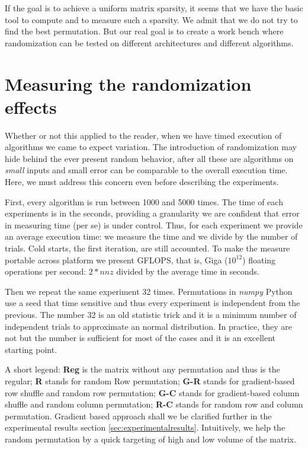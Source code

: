 \documentclass[manuscript,screen]{acmart}
\begin{document}

If the goal is to achieve a uniform matrix sparsity, it seems that we
have the basic tool to compute and to measure such a sparsity. We
admit that we do not try to find the best permutation. But our real
goal is to create a work bench where randomization can be tested on
different architectures and different algorithms.

\section{Measuring the randomization effects}
\label{sec:measuring}

Whether or not this applied to the reader, when we have timed
execution of algorithms we came to expect variation.  The introduction
of randomization may hide behind the ever present random behavior,
after all these are algorithms on {\em small} inputs and small error
can be comparable to the overall execution time. Here, we must address
this concern even before describing the experiments.

First, every algorithm is run between 1000 and 5000 times. The time of
each experiments is in the seconds, providing a granularity we are
confident that error in measuring time (per se) is under
control. Thus, for each experiment we provide an average execution
time: we measure the time and we divide by the number of trials. Cold
starts, the first iteration, are still accounted. To make the measure
portable across platform we present GFLOPS, that is, Giga ($10^12$)
floating operations per second: $2*nnz$ divided by the average time in
seconds.

Then we repeat the same experiment 32 times. Permutations in {\em
  numpy} Python use a seed that time sensitive and thus every
experiment is independent from the previous. The number 32 is an old
statistic trick and it is a minimum number of independent trials to
approximate an normal distribution. In practice, they are not but the
number is sufficient for most of the cases and it is an excellent
starting point.

A short legend: {\bf Reg} is the matrix without any permutation and
thus is the regular; {\bf R} stands for random Row permutation; {\bf
  G-R} stands for gradient-based row shuffle and random row
permutation; {\bf G-C} stands for gradient-based column shuffle and
random column permutation; {\bf R-C} stands for random row and column
permutation. Gradient based approach shall we be clarified further in
the experimental results section
\ref{sec:experimentalresults}. Intuitively, we help the random
permutation by a quick targeting of high and low volume of the matrix.
\end{document}
